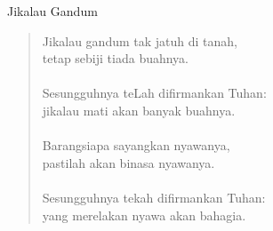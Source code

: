 \begin{center}
Jikalau Gandum
\end{center}

\begin{verse}
Jikalau gandum tak jatuh di tanah,\\
tetap sebiji tiada buahnya.\\
{~}\\
Sesungguhnya teLah difirmankan Tuhan:\\
jikalau mati akan banyak buahnya.\\
{~}\\
Barangsiapa sayangkan nyawanya,\\
pastilah akan binasa nyawanya.\\
{~}\\
Sesungguhnya tekah difirmankan Tuhan:\\
yang merelakan nyawa akan bahagia.
\end{verse}
